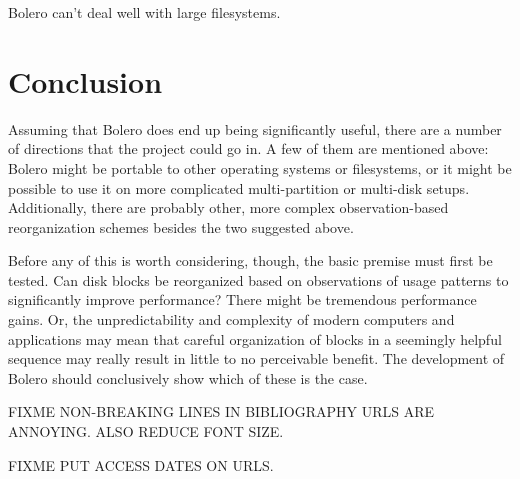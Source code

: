 \documentclass[10pt,twocolumn,letterpaper]{article}
\begin{document}
Bolero can't deal well with large filesystems.

\section{Conclusion}

Assuming that Bolero does end up being significantly useful, there are a number of directions that
the project could go in. A few of them are mentioned above: Bolero might be portable to other
operating systems or filesystems, or it might be possible to use it on more complicated multi-partition
or multi-disk setups. Additionally, there are probably other, more complex observation-based reorganization schemes
besides the two suggested above.

Before any of this is worth considering, though, the basic premise must first be tested. Can disk
blocks be reorganized based on observations of usage patterns to significantly improve performance?
There might be tremendous performance gains. Or, the unpredictability and complexity of modern
computers and applications may mean that careful organization of blocks in a seemingly helpful
sequence may really result in little to no perceivable benefit. The development of Bolero should conclusively
show which of these is the case.

FIXME NON-BREAKING LINES IN BIBLIOGRAPHY URLS ARE ANNOYING. ALSO REDUCE FONT SIZE.

FIXME PUT ACCESS DATES ON URLS.

{}

\end{document}
